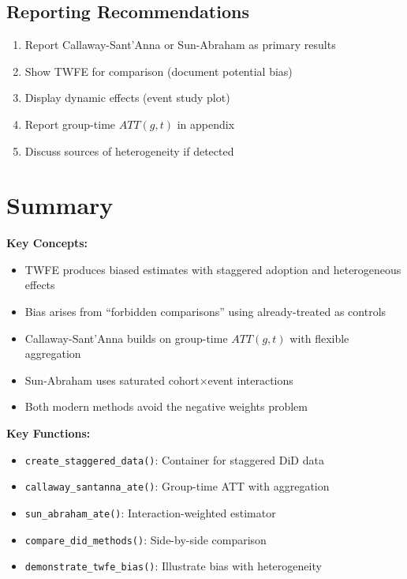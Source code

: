 \subsection{Reporting Recommendations}

\begin{enumerate}
    \item Report Callaway-Sant'Anna or Sun-Abraham as primary results
    \item Show TWFE for comparison (document potential bias)
    \item Display dynamic effects (event study plot)
    \item Report group-time $ATT(g,t)$ in appendix
    \item Discuss sources of heterogeneity if detected
\end{enumerate}

\section{Summary}
\label{sec:modern_summary}

\textbf{Key Concepts:}
\begin{itemize}
    \item TWFE produces biased estimates with staggered adoption and heterogeneous effects
    \item Bias arises from ``forbidden comparisons'' using already-treated as controls
    \item Callaway-Sant'Anna builds on group-time $ATT(g,t)$ with flexible aggregation
    \item Sun-Abraham uses saturated cohort$\times$event interactions
    \item Both modern methods avoid the negative weights problem
\end{itemize}

\textbf{Key Functions:}
\begin{itemize}
    \item \texttt{create\_staggered\_data()}: Container for staggered DiD data
    \item \texttt{callaway\_santanna\_ate()}: Group-time ATT with aggregation
    \item \texttt{sun\_abraham\_ate()}: Interaction-weighted estimator
    \item \texttt{compare\_did\_methods()}: Side-by-side comparison
    \item \texttt{demonstrate\_twfe\_bias()}: Illustrate bias with heterogeneity
\end{itemize}

